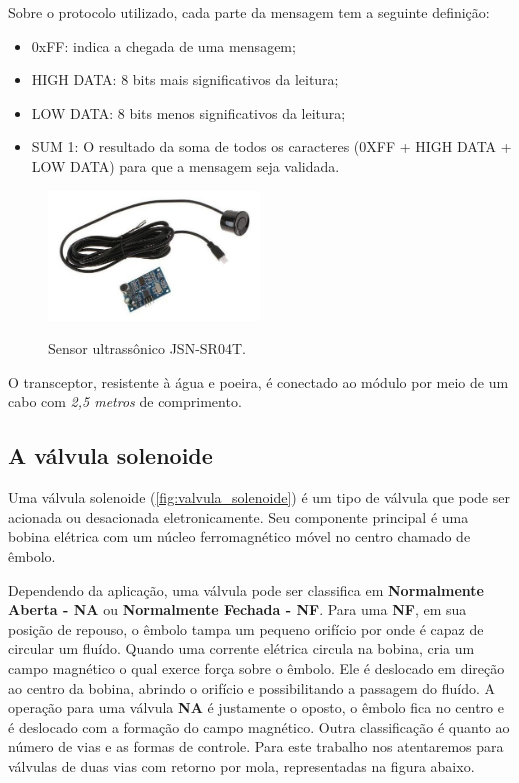 Sobre o protocolo utilizado, cada parte da mensagem tem a seguinte definição:

\begin{itemize}
	\item 0xFF: indica a chegada de uma mensagem;
	\item HIGH DATA: 8 bits mais significativos da leitura;
	\item LOW DATA: 8 bits menos significativos da leitura;
	\item SUM 1: O resultado da soma de todos os caracteres (0XFF + HIGH DATA + LOW DATA) para que a mensagem seja validada.
\end{itemize}



\begin{figure}[H]
	\centering
	\caption{Sensor ultrassônico JSN-SR04T.}
	\includegraphics[width=0.5\textwidth]{figuras/sensor_ultra.jpg}
	\label{fig:sensor_ultra}
\end{figure}

O transceptor, resistente à água e poeira, é conectado ao módulo por meio de um cabo com \textit{2,5 metros} de comprimento. 


\subsection{A válvula solenoide}

Uma válvula solenoide (\autoref{fig:valvula_solenoide}) é um tipo de válvula que pode ser acionada ou desacionada eletronicamente. Seu componente principal é uma bobina elétrica com um núcleo ferromagnético móvel no centro chamado de êmbolo.

Dependendo da aplicação, uma válvula pode ser classifica em \textbf{Normalmente Aberta - NA} ou\textbf{ Normalmente Fechada - NF}. Para uma \textbf{NF}, em sua posição de repouso, o êmbolo tampa um pequeno orifício por onde é capaz de circular um fluído. Quando uma corrente elétrica circula na bobina, cria um campo magnético o qual exerce força sobre o êmbolo. Ele é deslocado em direção ao centro da bobina, abrindo o orifício e possibilitando a passagem do fluído. A operação para uma válvula \textbf{NA} é justamente o oposto, o êmbolo fica no centro e é deslocado com a formação do campo magnético. Outra classificação é quanto ao número de vias e as formas de controle. Para este trabalho nos atentaremos para válvulas de duas vias com retorno por mola, representadas na figura abaixo.

